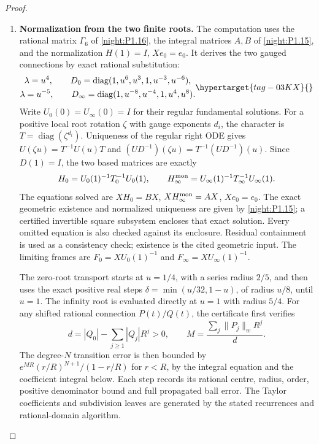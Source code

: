 \begin{proof}
\begin{enumerate}[label={$\langle1\rangle$\arabic*.}]
\begin{enumerate}[label={$\langle2\rangle$\arabic*.},leftmargin=*]
\item \textbf{Normalization from the two finite roots.}
The computation uses the rational matrix $\Gamma_6$ of
\cref{night:P1.16}, the integral matrices $A,B$ of
\cref{night:P1.15}, and the normalization $H(1)=I$, $Xe_0=e_0$.
It derives the two gauged connections by exact rational substitution:
\[
 \begin{gathered}
 \lambda=u^4,\qquad D_0=\operatorname{diag}(1,u^6,u^3,1,u^{-3},u^{-6}),\\
 \lambda=u^{-5},\qquad D_\infty=
 \operatorname{diag}(1,u^{-8},u^{-4},1,u^4,u^8).
 \end{gathered}\hypertarget{tag-03KX}{}\label{layout:V:fresh-gauges}
\]
Write $U_0(0)=U_\infty(0)=I$ for their regular fundamental
solutions.  For a positive local root rotation $\zeta$ with gauge
exponents $d_i$, the character is $T=\operatorname{diag}(\zeta^{d_i})$.
Uniqueness of the regular right ODE gives
$U(\zeta u)=T^{-1}U(u)T$ and
$(UD^{-1})(\zeta u)=T^{-1}(UD^{-1})(u)$.
Since $D(1)=I$, the two based matrices are exactly
\[
 H_0=U_0(1)^{-1}T_0^{-1}U_0(1),\qquad
 H_\infty^{\rm mon}=U_\infty(1)^{-1}T_\infty^{-1}U_\infty(1).
\]
The equations solved are $XH_0=BX$, $XH_\infty^{\rm mon}=AX$,
$Xe_0=e_0$.  The exact geometric existence and normalized uniqueness
are given by \cref{night:P1.15}; a certified invertible square
subsystem encloses that exact solution.  Every omitted equation is
also checked against its enclosure.  Residual containment is used
as a consistency check; existence is the cited geometric input.
The limiting frames are
$F_0=XU_0(1)^{-1}$ and $F_\infty=XU_\infty(1)^{-1}$.

The zero-root transport starts at $u=1/4$, with a series radius
$2/5$, and then uses the exact positive real steps
$\delta=\min(u/32,1-u)$, of radius $u/8$, until $u=1$.
The infinity root is evaluated directly at $u=1$ with radius $5/4$.
For any shifted rational connection $P(t)/Q(t)$, the certificate first verifies
\[
 d=|Q_0|-\sum_{j\ge1}|Q_j|R^j>0,\qquad
 M=\frac{\sum_j\|P_j\|_wR^j}{d}.
\]
The degree-$N$ transition error is then bounded by
$e^{MR}(r/R)^{N+1}/(1-r/R)$ for $r<R$, by the integral equation
and the coefficient integral below.  Each step records its
rational centre, radius, order, positive denominator bound and
full propagated ball error.  The Taylor coefficients and subdivision
leaves are generated by the stated recurrences and rational-domain
algorithm.


\end{enumerate}
\end{enumerate}
\end{proof}
